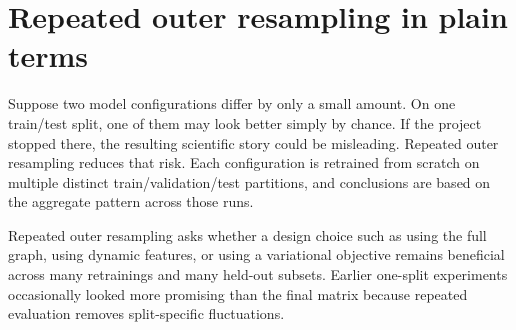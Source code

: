 \section{Repeated outer resampling in plain terms}

Suppose two model configurations differ by only a small amount. On one train/test split, one of them may look better simply by chance. If the project stopped there, the resulting scientific story could be misleading. Repeated outer resampling reduces that risk. Each configuration is retrained from scratch on multiple distinct train/validation/test partitions, and conclusions are based on the aggregate pattern across those runs.

Repeated outer resampling asks whether a design choice such as using the full graph, using dynamic features, or using a variational objective remains beneficial across many retrainings and many held-out subsets. Earlier one-split experiments occasionally looked more promising than the final matrix because repeated evaluation removes split-specific fluctuations.

